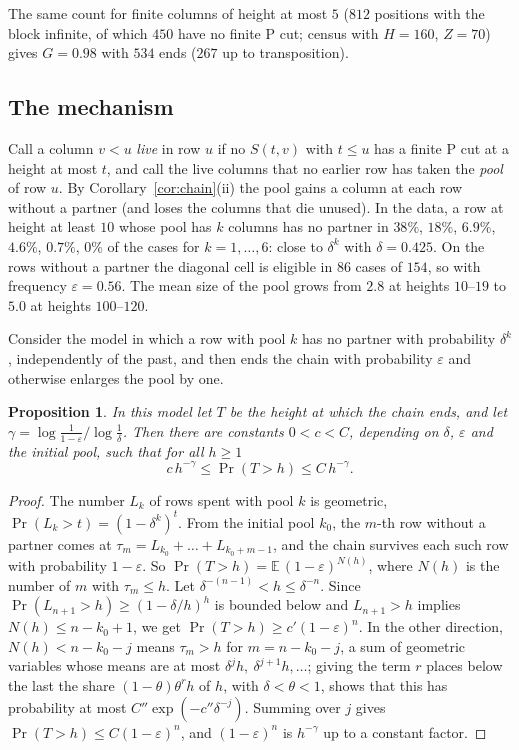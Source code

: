 \documentclass[11pt]{amsart}
\newtheorem{proposition}[theorem]{Proposition}
\theoremstyle{definition}
\theoremstyle{remark}
\begin{document}
The same count for finite columns of height at most $5$ ($812$ positions with the block
infinite, of which $450$ have no finite P cut; census with $H=160$, $Z=70$) gives $G=0.98$
with $534$ ends ($267$ up to transposition).

\subsection*{The mechanism}
Call a column $v<u$ \emph{live} in row $u$ if no $S(t,v)$ with $t\le u$ has a finite P cut
at a height at most $t$, and call the live columns that no earlier row has taken the
\emph{pool} of row $u$. By Corollary~\ref{cor:chain}(ii) the pool gains a column at each row
without a partner (and loses the columns that die unused). In the data, a row
at height at least $10$ whose pool has $k$ columns has no partner in $38\%$, $18\%$, $6.9\%$,
$4.6\%$, $0.7\%$, $0\%$ of the cases for $k=1,\dots,6$: close to $\delta^k$ with
$\delta=0.425$. On the rows without a partner the diagonal cell is eligible in $86$ cases of
$154$, so with frequency $\varepsilon=0.56$. The mean size of the pool grows from $2.8$ at
heights $10$--$19$ to $5.0$ at heights $100$--$120$.

Consider the model in which a row with pool $k$ has no partner with probability $\delta^k$,
independently of the past, and then ends the chain with probability $\varepsilon$ and
otherwise enlarges the pool by one.

\begin{proposition}\label{prop:model}
In this model let $T$ be the height at which the chain ends, and let
$\gamma=\log\frac1{1-\varepsilon}\big/\log\frac1\delta$. Then there are constants $0<c<C$,
depending on $\delta$, $\varepsilon$ and the initial pool, such that for all $h\ge1$
\[
c\,h^{-\gamma}\le\Pr(T>h)\le C\,h^{-\gamma}.
\]
\end{proposition}
\begin{proof}
The number $L_k$ of rows spent with pool $k$ is geometric, $\Pr(L_k>t)=(1-\delta^k)^t$. From
the initial pool $k_0$, the $m$-th row without a partner comes at
$\tau_m=L_{k_0}+\dots+L_{k_0+m-1}$, and the chain survives each such row with probability
$1-\varepsilon$. So $\Pr(T>h)=\mathbb E\,(1-\varepsilon)^{N(h)}$, where $N(h)$ is the number
of $m$ with $\tau_m\le h$. Let $\delta^{-(n-1)}<h\le\delta^{-n}$. Since
$\Pr(L_{n+1}>h)\ge(1-\delta/h)^h$ is bounded below and $L_{n+1}>h$ implies
$N(h)\le n-k_0+1$, we get $\Pr(T>h)\ge c'(1-\varepsilon)^{n}$. In the other direction,
$N(h)<n-k_0-j$ means $\tau_m>h$ for $m=n-k_0-j$, a sum of geometric variables whose means
are at most $\delta^{j}h,\ \delta^{j+1}h,\dots$; giving the term $r$ places below the last
the share $(1-\theta)\theta^rh$ of $h$, with $\delta<\theta<1$, shows that this has
probability at most $C''\exp(-c''\delta^{-j})$. Summing over $j$ gives
$\Pr(T>h)\le C(1-\varepsilon)^{n}$, and $(1-\varepsilon)^n$ is $h^{-\gamma}$ up to a constant
factor.
\end{proof}
\end{document}
